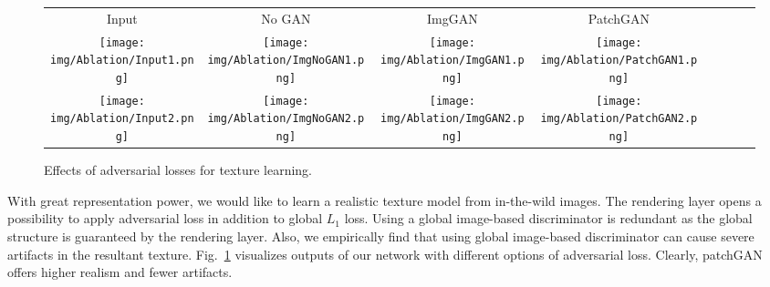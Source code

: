 \begin{figure}[t!]
\begin{center}
\small
\setlength{\tabcolsep}{3pt}
\begin{tabular}{c@{\hskip 1.5mm}c@{\hskip 1mm}c@{\hskip 1.5mm}c@{\hskip 1mm}c@{\hskip 1.5mm}c@{\hskip 1mm}c@{\hskip 1mm}c@{}}
Input & No GAN & ImgGAN& PatchGAN \\
\texttt{[image: img/Ablation/Input1.png]} &
\texttt{[image: img/Ablation/ImgNoGAN1.png]} &
\texttt{[image: img/Ablation/ImgGAN1.png]} &
\texttt{[image: img/Ablation/PatchGAN1.png]} &
\\
\texttt{[image: img/Ablation/Input2.png]} &
\texttt{[image: img/Ablation/ImgNoGAN2.png]} &
\texttt{[image: img/Ablation/ImgGAN2.png]} &
\texttt{[image: img/Ablation/PatchGAN2.png]} &
\end{tabular}
\vspace{-2mm}
\caption{\small Effects of adversarial losses for texture learning.}
\label{fig:abl_tex}
\figvspace \vspace{-2mm}
\end{center}
\end{figure}

With great representation power, we would like to learn a realistic texture model from in-the-wild images. 
The rendering layer opens a possibility to apply adversarial loss in addition to global $L_1$ loss. 
Using a global image-based discriminator is redundant as the global structure is guaranteed by the rendering layer. 
Also, we empirically find that using global image-based discriminator can cause severe artifacts in the resultant texture. 
Fig.~\ref{fig:abl_tex} visualizes outputs of our network with different options of adversarial loss. 
Clearly, patchGAN offers higher realism and fewer artifacts.
